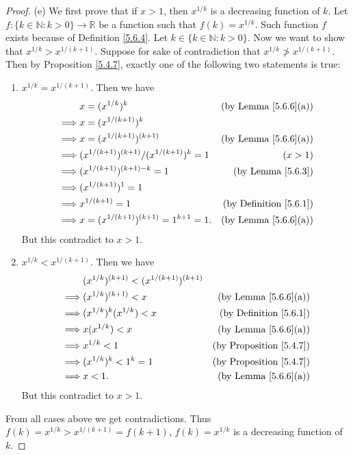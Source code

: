 \begin{proof}{(e)}
We first prove that if \(x > 1\), then \(x^{1 / k}\) is a decreasing function of \(k\).
Let \(f : \{k \in \mathds{N} : k > 0\} \to \mathds{R}\) be a function such that \(f(k) = x^{1 / k}\).
Such function \(f\) exists because of Definition \ref{5.6.4}.
Let \(k \in \{k \in \mathds{N} : k > 0\}\).
Now we want to show that \(x^{1 / k} > x^{1 / (k + 1)}\).
Suppose for sake of contradiction that \(x^{1 / k} \not> x^{1 / (k + 1)}\).
Then by Proposition \ref{5.4.7}, exactly one of the following two statements is true:
\begin{enumerate}[label=(\Roman*)]
    \item \(x^{1 / k} = x^{1 / (k + 1)}\).
    Then we have
    \begin{align*}
        & x = (x^{1 / k})^k & \text{(by Lemma \ref{5.6.6}(a))} \\
        \implies & x = (x^{1 / (k + 1)})^k \\
        \implies & x = (x^{1 / (k + 1)})^{(k + 1)} & \text{(by Lemma \ref{5.6.6}(a))} \\
        \implies & (x^{1 / (k + 1)})^{(k + 1)} / (x^{1 / (k + 1)})^k = 1 & (x > 1) \\
        \implies & (x^{1 / (k + 1)})^{(k + 1) - k} = 1 & \text{(by Lemma \ref{5.6.3})} \\
        \implies & (x^{1 / (k + 1)})^1 = 1 \\
        \implies & x^{1 / (k + 1)} = 1 & \text{(by Definition \ref{5.6.1})} \\
        \implies & x = (x^{1 / (k + 1)})^{(k + 1)} = 1^{k + 1} = 1. & \text{(by Lemma \ref{5.6.6}(a))}
    \end{align*}
    But this contradict to \(x > 1\).
    \item \(x^{1 / k} < x^{1 / (k + 1)}\).
    Then we have
    \begin{align*}
        & (x^{1 / k})^{(k + 1)} < (x^{1 / (k + 1)})^{(k + 1)} \\
        \implies & (x^{1 / k})^{(k + 1)} < x & \text{(by Lemma \ref{5.6.6}(a))} \\
        \implies & (x^{1 / k})^k (x^{1 / k}) < x & \text{(by Definition \ref{5.6.1})} \\
        \implies & x (x^{1 / k}) < x & \text{(by Lemma \ref{5.6.6}(a))} \\
        \implies & x^{1 / k} < 1 & \text{(by Proposition \ref{5.4.7})} \\
        \implies & (x^{1 / k})^k < 1^k = 1 & \text{(by Proposition \ref{5.4.7})} \\
        \implies & x < 1. & \text{(by Lemma \ref{5.6.6}(a))}
    \end{align*}
    But this contradict to \(x > 1\).
\end{enumerate}
From all cases above we get contradictions.
Thus \(f(k) = x^{1 / k} > x^{1 / (k + 1)} = f(k + 1)\), \(f(k) = x^{1 / k}\) is a decreasing function of \(k\).


\end{proof}
